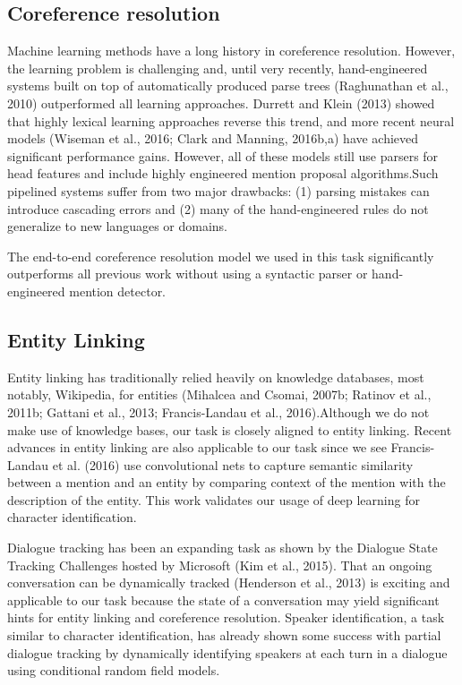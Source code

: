 \documentclass[11pt]{article}
\begin{document}
\subsection{Coreference resolution}
Machine learning methods have a long history in coreference resolution. However, the learning problem is challenging and, until very recently, hand-engineered systems built on top of automatically produced parse trees (Raghunathan et al., 2010) outperformed all learning approaches. Durrett and Klein (2013) showed that highly lexical learning approaches reverse this trend, and more recent neural models (Wiseman et al., 2016; Clark and Manning, 2016b,a) have achieved significant performance gains. However, all of these models still use parsers for head features and include highly engineered mention proposal algorithms.Such pipelined systems suffer from two major drawbacks: (1) parsing mistakes can introduce cascading errors and (2) many of the hand-engineered rules do not generalize to new languages or domains.  

The end-to-end coreference resolution model we used in this task significantly outperforms all previous work without using a syntactic parser or hand-engineered mention detector.

\subsection{Entity Linking}

Entity linking has traditionally relied heavily on knowledge databases, most notably, Wikipedia, for entities (Mihalcea and Csomai, 2007b; Ratinov et al., 2011b; Gattani et al., 2013; Francis-Landau et al., 2016).Although we do not make use of knowledge bases, our task is closely aligned to entity linking. Recent advances in entity linking are
also applicable to our task since we see Francis-Landau et al. (2016) use convolutional nets to capture semantic similarity between a mention and an entity by comparing context of the mention with the description of the entity. This work validates our usage of deep learning for character identification.

Dialogue tracking has been an expanding task as shown by the Dialogue State Tracking Challenges hosted by Microsoft (Kim et al., 2015). That an ongoing conversation can be dynamically tracked (Henderson et al., 2013) is exciting and applicable to our task because the state of a conversation may yield significant hints for entity linking and coreference resolution. Speaker identification, a task similar to character identification, has already shown some success with partial dialogue tracking by dynamically identifying speakers at each turn in a dialogue using conditional random field models.
\end{document}

